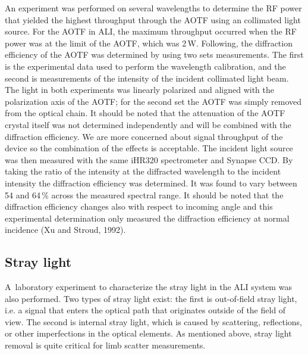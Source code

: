 \documentclass[amt]{copernicus}
\begin{document}
An experiment was performed on several wavelengths to determine the RF power that
yielded the highest throughput through the AOTF using an collimated light source.
For the AOTF in ALI, the maximum throughput occurred when the RF power was at the
limit of the AOTF, which was 2\,W. Following, the diffraction efficiency of the AOTF
was determined by using two sets measurements. The first is the experimental data used
to perform the wavelength calibration, and the second is measurements of the intensity of
the incident collimated light beam. The light in both experiments was linearly polarized
and aligned with the polarization axis of the AOTF; for the second set the AOTF was
simply removed from the optical chain. It should be noted that the attenuation of the AOTF
crystal itself was not determined independently and will be combined with the diffraction
efficiency. We are more concerned about signal throughput of the device so the combination
of the effects is acceptable. The incident light source was then measured with the same iHR320
spectrometer and Synapse CCD. By taking the ratio of the intensity at the diffracted wavelength
to the incident intensity the diffraction efficiency was determined. It was found to vary between
54 and 64\,{\%} across the measured spectral range. It should be noted
that the diffraction efficiency changes also with respect to incoming
angle and this experimental determination only measured the
diffraction efficiency at normal incidence (Xu and Stroud, 1992).

\subsection{Stray light}

A~laboratory experiment to characterize the stray light in the ALI
system was also performed. Two types of stray light exist: the first
is out-of-field stray light, i.e. a signal that enters the optical path
that originates outside of the field of view. The second is internal
stray light, which is caused by scattering, reflections, or other
imperfections in the optical elements. As mentioned above, stray light
removal is quite critical for limb scatter measurements.
\end{document}

